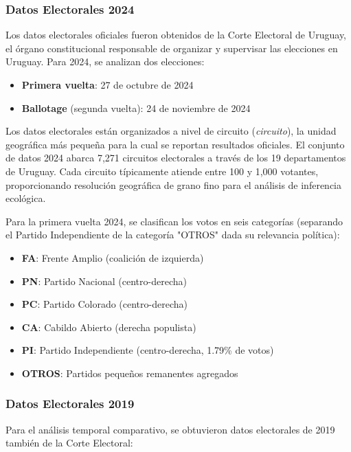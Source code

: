 \subsubsection{Datos Electorales 2024}

Los datos electorales oficiales fueron obtenidos de la Corte Electoral de Uruguay, el órgano constitucional responsable de organizar y supervisar las elecciones en Uruguay. Para 2024, se analizan dos elecciones:

\begin{itemize}
    \item \textbf{Primera vuelta}: 27 de octubre de 2024
    \item \textbf{Ballotage} (segunda vuelta): 24 de noviembre de 2024
\end{itemize}

Los datos electorales están organizados a nivel de circuito (\textit{circuito}), la unidad geográfica más pequeña para la cual se reportan resultados oficiales. El conjunto de datos 2024 abarca 7,271 circuitos electorales a través de los 19 departamentos de Uruguay. Cada circuito típicamente atiende entre 100 y 1,000 votantes, proporcionando resolución geográfica de grano fino para el análisis de inferencia ecológica.

Para la primera vuelta 2024, se clasifican los votos en seis categorías (separando el Partido Independiente de la categoría "OTROS" dada su relevancia política):
\begin{itemize}
    \item \textbf{FA}: Frente Amplio (coalición de izquierda)
    \item \textbf{PN}: Partido Nacional (centro-derecha)
    \item \textbf{PC}: Partido Colorado (centro-derecha)
    \item \textbf{CA}: Cabildo Abierto (derecha populista)
    \item \textbf{PI}: Partido Independiente (centro-derecha, 1.79\% de votos)
    \item \textbf{OTROS}: Partidos pequeños remanentes agregados
\end{itemize}

\subsubsection{Datos Electorales 2019}

Para el análisis temporal comparativo, se obtuvieron datos electorales de 2019 también de la Corte Electoral:

